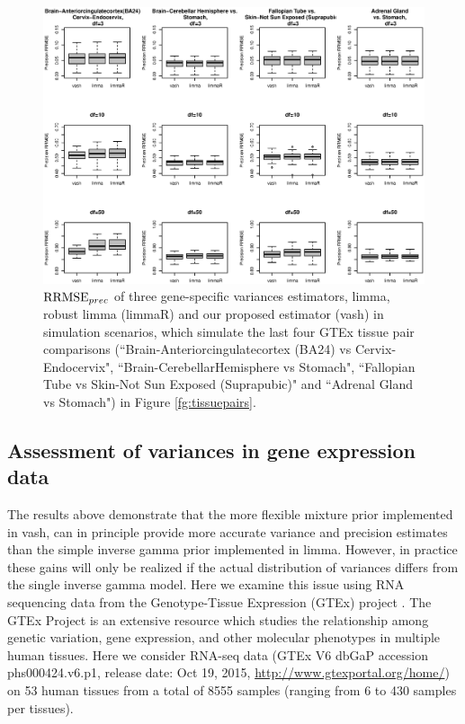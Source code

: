 \documentclass{bioinfo}
\begin{document}
\begin{figure}[!hbp]
\includegraphics[width=\linewidth]{rmse_gtex.eps}
\caption{$\textrm{RRMSE}_{prec}$ of three gene-specific variances estimators, limma, robust limma (limmaR) and our proposed estimator (vash) in simulation scenarios, which simulate the last four GTEx tissue pair comparisons (``Brain-Anteriorcingulatecortex (BA24) vs Cervix-Endocervix", ``Brain-CerebellarHemisphere vs Stomach", ``Fallopian Tube vs Skin-Not Sun Exposed (Suprapubic)" and ``Adrenal Gland vs Stomach") in Figure \ref{fg:tissuepairs}.}
\label{fg:rmsegtex}
\end{figure}

\subsection{Assessment of variances in gene expression data}

The results above demonstrate that the more flexible mixture prior implemented in vash, can in principle provide more accurate variance and precision estimates than
the simple inverse gamma prior implemented in limma. However, in practice these gains will only be realized if the actual distribution of variances differs from the single inverse gamma model. Here
we examine this issue using RNA sequencing data from the Genotype-Tissue Expression (GTEx) project \citep{gtex}. The GTEx Project is an extensive resource which studies the relationship among genetic variation, gene expression, and other molecular phenotypes in multiple human tissues. Here we consider RNA-seq data (GTEx V6 dbGaP accession phs000424.v6.p1, release date: Oct 19, 2015, \href{http://www.gtexportal.org/home/}{http://www.gtexportal.org/home/}) on 53 human tissues from a total of 8555 samples (ranging from 6 to 430 samples per tissues).
 
\end{document}
